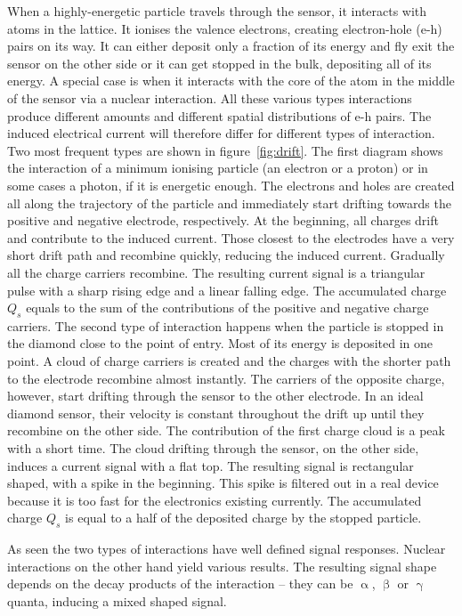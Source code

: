 \documentclass[twoside,12pt]{packages/mytustyle}  %
\begin{document}
\begin{figure}[!t]
\end{figure}When a highly-energetic particle travels through the sensor, it interacts with atoms in the lattice. It ionises the valence electrons, creating electron-hole (e-h) pairs on its way. It can either deposit only a fraction of its energy and fly exit the sensor on the other side or it can get stopped in the bulk, depositing all of its energy. A special case is when it interacts with the core of the atom in the middle of the sensor via a nuclear interaction. All these various types interactions produce different amounts and different spatial distributions of e-h pairs. The induced electrical current will therefore differ for different types of interaction. Two most frequent types are shown in figure~\ref{fig:drift}. The first diagram shows the interaction of a minimum ionising particle (an electron or a proton) or in some cases a photon, if it is energetic enough. The electrons and holes are created all along the trajectory of the particle and immediately start drifting towards the positive and negative electrode, respectively. At the beginning, all charges drift and contribute to the induced current. Those closest to the electrodes have a very short drift path and recombine quickly, reducing the induced current. Gradually all the charge carriers recombine. The resulting current signal is a triangular pulse with a sharp rising edge and a linear falling edge. The accumulated charge $Q_s$ equals to the sum of the contributions of the positive and negative charge carriers. The second type of interaction happens when the particle is stopped in the diamond close to the point of entry. Most of its energy is deposited in one point. A cloud of charge carriers is created and the charges with the shorter path to the electrode recombine almost instantly. The carriers of the opposite charge, however, start drifting through the sensor to the other electrode. In an ideal diamond sensor, their velocity is constant throughout the drift up until they recombine on the other side. The contribution of the first charge cloud is a peak with a short time. The cloud drifting through the sensor, on the other side, induces a current signal with a flat top. The resulting signal is rectangular shaped, with a spike in the beginning. This spike is filtered out in a real device because it is too fast for the electronics existing currently. The accumulated charge $Q_s$ is equal to a half of the deposited charge by the stopped particle.

As seen the two types of interactions have well defined signal responses. Nuclear interactions on the other hand yield various results. The resulting signal shape depends on the decay products of the interaction -- they can be $\upalpha$, $\upbeta$ or $\upgamma$ quanta, inducing a mixed shaped signal. 
%
\end{document}
